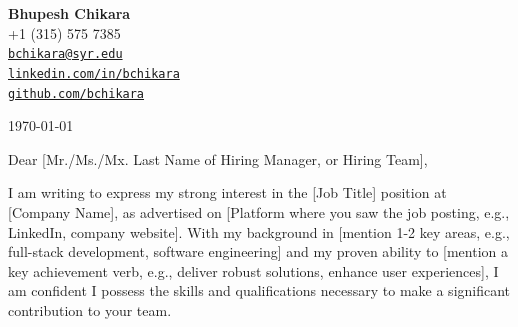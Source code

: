 \documentclass[letterpaper,11pt]{article}
\begin{document}
\begin{raggedright} %
\textbf{\Large Bhupesh Chikara} \\
+1 (315) 575 7385 \\
\href{mailto:bchikara@syr.edu}{\nolinkurl{bchikara@syr.edu}} \\
\href{https://linkedin.com/in/bchikara}{\nolinkurl{linkedin.com/in/bchikara}} \\
\href{https://github.com/bchikara}{\nolinkurl{github.com/bchikara}}
\vspace{2\baselineskip} %
\end{raggedright}

\begin{raggedright}
\today \\ %
\vspace{2\baselineskip} %
\end{raggedright}

\begin{raggedright}
\vspace{2\baselineskip} %
\end{raggedright}

\begin{raggedright}
Dear [Mr./Ms./Mx. Last Name of Hiring Manager, or Hiring Team], \\
\vspace{1\baselineskip} %
\end{raggedright}

\begin{raggedright}
I am writing to express my strong interest in the [Job Title] position at [Company Name], as advertised on [Platform where you saw the job posting, e.g., LinkedIn, company website]. With my background in [mention 1-2 key areas, e.g., full-stack development, software engineering] and my proven ability to [mention a key achievement verb, e.g., deliver robust solutions, enhance user experiences], I am confident I possess the skills and qualifications necessary to make a significant contribution to your team.
\vspace{1\baselineskip}
\end{raggedright}
\end{document}

